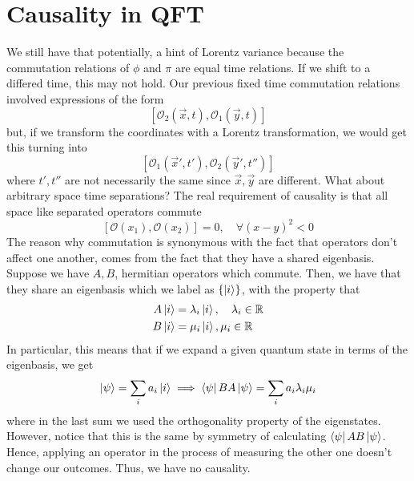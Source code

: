 \section{Causality in QFT} 
We still have that potentially, a hint of Lorentz variance because 
the commutation relations of $ \phi$ and $\pi $ are 
equal time relations. If we shift to a differed time, this
may not hold. Our previous fixed time commutation relations involved expressions of the form 
\[
[ \mathcal{ O}_2( \vec{x}, t ) , \mathcal{O}_1 ( \vec{y}, t ) ]
\] but, if we transform the coordinates with a Lorentz transformation, we would get this turning into
\[
[ \mathcal{ O }_1 ( \vec{x}' , t' ) , \mathcal{ O }_2 ( \vec{y}', t'' ) ]  
\] where $ t' ,  t'' $ are not necessarily the same since $ \vec{x}, \vec{y}$ are different. 
What about arbitrary space time separations? 
The real requirement of causality is that all 
space like separated operators commute 
\[ 	[ \mathcal{ O }( x_1 ) , \mathcal{ O }( x_2) ] = 0 , \quad \forall ( x- y)^2 < 0 
\] The reason why commutation is synonymous 
with the fact that operators don't affect one another, 
comes from the fact that they have a shared eigenbasis. 
Suppose we have $A, B  $, hermitian operators which commute. 
Then, we have that they share an eigenbasis which we label as $ \left\{  \ket{ i }  \right\} $, with the property that 
\begin{align*}
A \ket{ i }  & = \lambda_i \ket{ i }, \quad \lambda_i \in \mathbb { R} \\
B \ket{i } &=  \mu_i \ket{ i }, \mu_i \in \mathbb{ R}  
\end{align*} In particular, this means that 
if we expand a given quantum state in terms of the eigenbasis, we get 
\[
\ket{ \psi }  = \sum_{ i } a_{ i } \ket{ i } \implies \bra{ \psi }BA\ket{\psi}  = \sum_i a_{ i } \lambda_{ i } \mu_{ i}
\] where in the last sum we used the orthogonality property 
of the eigenstates. However, notice that this is the same by symmetry of 
calculating $ \bra{ \psi }AB\ket{ \psi}$. Hence, applying an operator 
in the process of measuring the other one doesn't change our 
outcomes. Thus, we have no causality.

